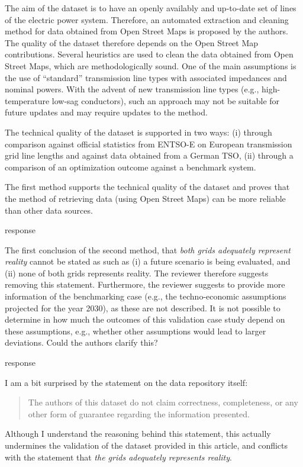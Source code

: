 \documentclass{response}
\begin{document}
\RC The aim of the dataset is to have an openly availably and up-to-date set of lines of the electric power system. Therefore, an automated extraction and cleaning method for data obtained from Open Street Maps is proposed by the authors. The quality of the dataset therefore depends on the Open Street Map contributions. Several heuristics are used to clean the data obtained from Open Street Maps, which are methodologically sound. One of the main assumptions is the use of “standard” transmission line types with associated impedances and nominal powers. With the advent of new transmission line types (e.g., high-temperature low-sag conductors), such an approach may not be suitable for future updates and may require updates to the method.

\RC The technical quality of the dataset is supported in two ways: (i) through comparison against official statistics from ENTSO-E on European transmission grid line lengths and against data obtained from a German TSO, (ii) through a comparison of an optimization outcome against a benchmark system. 

\RC The first method supports the technical quality of the dataset and proves that the method of retrieving data (using Open Street Maps) can be more reliable than other data sources. 

\AR response

\RC The first conclusion of the second method, that \textit{both grids adequately represent reality} cannot be stated as such as (i) a future scenario is being evaluated, and (ii) none of both grids represents reality. The reviewer therefore suggests removing this statement. Furthermore, the reviewer suggests to provide more information of the benchmarking case (e.g., the techno-economic assumptions projected for the year 2030), as these are not described. It is not possible to determine in how much the outcomes of this validation case study depend on these assumptions, e.g., whether other assumptions would lead to larger deviations. Could the authors clarify this? 

\AR response

\RC I am a bit surprised by the statement on the data repository itself: 
\begin{quote}
    The authors of this dataset do not claim correctness, completeness, or any other form of guarantee regarding the information presented.
\end{quote}
Although I understand the reasoning behind this statement, this actually undermines the validation of the dataset provided in this article, and conflicts with the statement that \textit{the grids adequately represents reality}.
\end{document}
